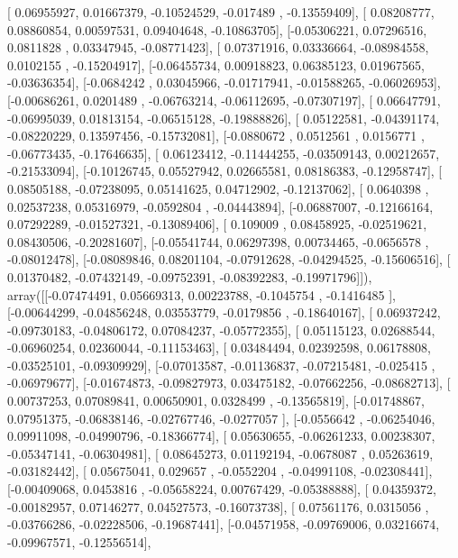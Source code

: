 \documentclass{article}
\begin{document}
       [ 0.06955927,  0.01667379, -0.10524529, -0.017489  , -0.13559409],
       [ 0.08208777,  0.08860854,  0.00597531,  0.09404648, -0.10863705],
       [-0.05306221,  0.07296516,  0.0811828 ,  0.03347945, -0.08771423],
       [ 0.07371916,  0.03336664, -0.08984558,  0.0102155 , -0.15204917],
       [-0.06455734,  0.00918823,  0.06385123,  0.01967565, -0.03636354],
       [-0.0684242 ,  0.03045966, -0.01717941, -0.01588265, -0.06026953],
       [-0.00686261,  0.0201489 , -0.06763214, -0.06112695, -0.07307197],
       [ 0.06647791, -0.06995039,  0.01813154, -0.06515128, -0.19888826],
       [ 0.05122581, -0.04391174, -0.08220229,  0.13597456, -0.15732081],
       [-0.0880672 ,  0.0512561 ,  0.0156771 , -0.06773435, -0.17646635],
       [ 0.06123412, -0.11444255, -0.03509143,  0.00212657, -0.21533094],
       [-0.10126745,  0.05527942,  0.02665581,  0.08186383, -0.12958747],
       [ 0.08505188, -0.07238095,  0.05141625,  0.04712902, -0.12137062],
       [ 0.0640398 ,  0.02537238,  0.05316979, -0.0592804 , -0.04443894],
       [-0.06887007, -0.12166164,  0.07292289, -0.01527321, -0.13089406],
       [ 0.109009  ,  0.08458925, -0.02519621,  0.08430506, -0.20281607],
       [-0.05541744,  0.06297398,  0.00734465, -0.0656578 , -0.08012478],
       [-0.08089846,  0.08201104, -0.07912628, -0.04294525, -0.15606516],
       [ 0.01370482, -0.07432149, -0.09752391, -0.08392283, -0.19971796]]), array([[-0.07474491,  0.05669313,  0.00223788, -0.1045754 , -0.1416485 ],
       [-0.00644299, -0.04856248,  0.03553779, -0.0179856 , -0.18640167],
       [ 0.06937242, -0.09730183, -0.04806172,  0.07084237, -0.05772355],
       [ 0.05115123,  0.02688544, -0.06960254,  0.02360044, -0.11153463],
       [ 0.03484494,  0.02392598,  0.06178808, -0.03525101, -0.09309929],
       [-0.07013587, -0.01136837, -0.07215481, -0.025415  , -0.06979677],
       [-0.01674873, -0.09827973,  0.03475182, -0.07662256, -0.08682713],
       [ 0.00737253,  0.07089841,  0.00650901,  0.0328499 , -0.13565819],
       [-0.01748867,  0.07951375, -0.06838146, -0.02767746, -0.0277057 ],
       [-0.0556642 , -0.06254046,  0.09911098, -0.04990796, -0.18366774],
       [ 0.05630655, -0.06261233,  0.00238307, -0.05347141, -0.06304981],
       [ 0.08645273,  0.01192194, -0.0678087 ,  0.05263619, -0.03182442],
       [ 0.05675041,  0.029657  , -0.0552204 , -0.04991108, -0.02308441],
       [-0.00409068,  0.0453816 , -0.05658224,  0.00767429, -0.05388888],
       [ 0.04359372, -0.00182957,  0.07146277,  0.04527573, -0.16073738],
       [ 0.07561176,  0.0315056 , -0.03766286, -0.02228506, -0.19687441],
       [-0.04571958, -0.09769006,  0.03216674, -0.09967571, -0.12556514],
\end{document}

